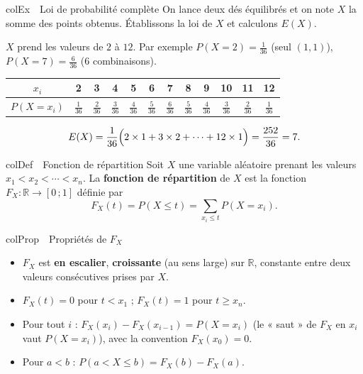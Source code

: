 \documentclass[11pt,a4paper]{article}
\newenvironment{definition}[1][Définition]
  {\begin{fiche}{colDef}{\ding{110}~~#1}}{\end{fiche}}
\newenvironment{propriete}[1][Propriété]
  {\begin{fiche}{colProp}{\ding{72}~~#1}}{\end{fiche}}
\newenvironment{exemple}[1][Exemple]
  {\begin{fiche}{colEx}{\ding{217}~~#1}}{\end{fiche}}
\begin{document}
\begin{exemple}[Loi de probabilité complète]
On lance deux dés équilibrés et on note $X$ la somme des points obtenus. Établissons la loi de $X$ et calculons $E(X)$.

\smallskip
$X$ prend les valeurs de $2$ à $12$. Par exemple $P(X=2)=\frac1{36}$ (seul $(1,1)$), $P(X=7)=\frac6{36}$ (6 combinaisons).

\begin{center}
\renewcommand{\arraystretch}{1.3}
\small
\begin{tabular}{c|ccccccccccc}
$x_i$ & 2 & 3 & 4 & 5 & 6 & 7 & 8 & 9 & 10 & 11 & 12 \\ \hline
$P(X=x_i)$ & $\frac1{36}$ & $\frac2{36}$ & $\frac3{36}$ & $\frac4{36}$ & $\frac5{36}$ & $\frac6{36}$ & $\frac5{36}$ & $\frac4{36}$ & $\frac3{36}$ & $\frac2{36}$ & $\frac1{36}$ \\
\end{tabular}
\end{center}

\[
  E(X) = \frac{1}{36}\Bigl(2\times1+3\times2+\cdots+12\times1\Bigr) = \frac{252}{36} = 7.
\]
\end{exemple}

\begin{definition}[Fonction de répartition]
Soit $X$ une variable aléatoire prenant les valeurs $x_1<x_2<\cdots<x_n$. La \textbf{fonction de répartition} de $X$ est la fonction $F_X:\mathbb{R}\to[0\,;1]$ définie par
\[
  F_X(t) = P(X\leq t) = \sum_{x_i\leq t}P(X=x_i).
\]
\end{definition}

\begin{propriete}[Propriétés de $F_X$]
\begin{itemize}[leftmargin=6mm, itemsep=0.5mm]
  \item $F_X$ est \textbf{en escalier}, \textbf{croissante} (au sens large) sur $\mathbb{R}$, constante entre deux valeurs consécutives prises par $X$.
  \item $F_X(t)=0$ pour $t<x_1$ ; \quad $F_X(t)=1$ pour $t\geq x_n$.
  \item Pour tout $i$ : $F_X(x_i)-F_X(x_{i-1}) = P(X=x_i)$ (le « saut » de $F_X$ en $x_i$ vaut $P(X=x_i)$), avec la convention $F_X(x_0)=0$.
  \item Pour $a<b$ : $P(a<X\leq b)=F_X(b)-F_X(a)$.
\end{itemize}
\end{propriete}
\end{document}
